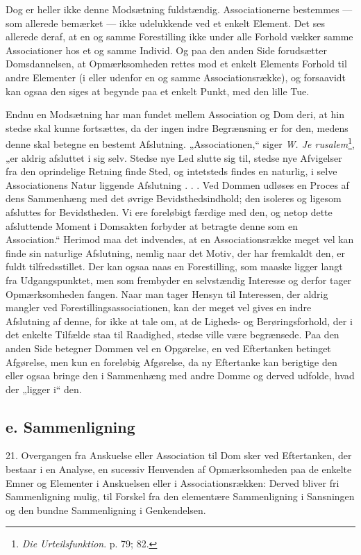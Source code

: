 \documentclass[12pt,a4paper]{book}
\newcommand{\opage}[1]{\marginnote{\footnotesize\textit{[#1]}}}
\begin{document}
Dog er heller ikke denne Modsætning fuldstændig. Associationerne
bestemmes --- som allerede bemærket --- ikke udelukkende ved et enkelt
Element. Det ses allerede deraf, at en og samme Forestilling ikke under
alle Forhold vækker samme Associationer hos et og samme Individ. Og paa
den anden Side forudsætter Domsdannelsen, at Opmærksomheden rettes mod et
enkelt Elements Forhold til andre Elementer (i eller udenfor en og samme
Associationsrække), og forsaavidt kan ogsaa den siges at begynde paa et
enkelt Punkt, med den lille Tue.

Endnu en Modsætning har man fundet mellem Association og Dom deri, at
hin stedse skal kunne fortsættes, da der ingen indre Begrænsning er for
den, medens denne skal betegne en bestemt Afslutning. „Associationen,“
siger \emph{W. Je%
\opage{63}rusalem}\footnote{\emph{Die Urteilsfunktion}. p. 79;
82.}, „er aldrig afsluttet i sig selv. Stedse nye Led slutte sig til,
stedse nye Afvigelser fra den oprindelige Retning finde Sted, og
intetsteds findes en naturlig, i selve Associationens Natur liggende
Afslutning . . . Ved Dommen udløses en Proces af dens Sammenhæng med det
øvrige Bevidsthedsindhold; den isoleres og ligesom afsluttes for
Bevidstheden. Vi ere foreløbigt færdige med den, og netop dette
afsluttende Moment i Domsakten forbyder at betragte denne som en
Association.“ Herimod maa det indvendes, at en Associationsrække meget
vel kan finde sin naturlige Afslutning, nemlig naar det Motiv, der har
fremkaldt den, er fuldt tilfredsstillet. Der kan ogsaa naas en
Forestilling, som maaske ligger langt fra Udgangspunktet, men som
frembyder en selvstændig Interesse og derfor tager Opmærksomheden
fangen. Naar man tager Hensyn til Interessen, der aldrig mangler ved
Forestillingsassociationen, kan der meget vel gives en indre Afslutning
af denne, for ikke at tale om, at de Ligheds- og Berøringsforhold, der i
det enkelte Tilfælde staa til Raadighed, stedse ville være begrænsede.
Paa den anden Side betegner Dommen vel en Opgørelse, en ved Eftertanken
betinget Afgørelse, men kun en foreløbig Afgørelse, da ny Eftertanke kan
berigtige den eller ogsaa bringe den i Sammenhæng med andre Domme og
derved udfolde, hvad der „ligger i“ den.

\subsection*{e. Sammenligning}
\label{ssec:sammenligning}

21. Overgangen fra Anskuelse eller Association til Dom sker ved
Eftertanken, der bestaar i en Analyse, en sucessiv Henvenden af
Opmærksomheden paa de enkelte Emner og Elementer i Anskuelsen eller i Associationsrækken: Derved bliver fri Sammenligning mulig, til Forskel
fra den elementære Sammenligning i Sansningen og den bundne
Sammenligning i Genkendelsen.
\end{document}
